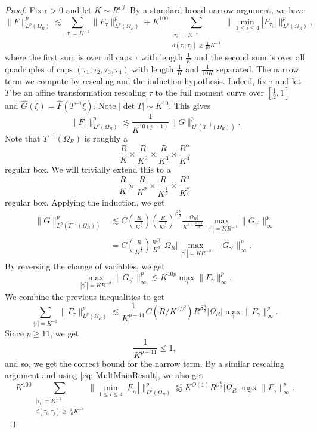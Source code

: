 \documentclass[12pt]{amsart}
\providecommand{\wh}{\widehat}
\begin{document}
\begin{proof}
    Fix $\epsilon>0$ and let $K\sim R^{\epsilon\beta}$. By a standard broad-narrow argument, we have $$\|F\|_{L^{p}(\Omega_R)}^{p}\lesssim \sum_{|\tau|=K^{-1}}\|F_\tau\|_{L^{p}(\Omega_R)}^{p}+K^{100}\sum_{\substack{|\tau_i|=K^{-1}\\ d(\tau_i, \tau_j)\ge \frac{1}{10}K^{-1}}}\|\min_{1\le i\le 4}|F_{\tau_i}|\|_{L^{p}(\Omega_R)}^{p},$$ where the first sum is over all caps $\tau$ with length $\frac{1}{K}$ and the second sum is over all quadruples of caps $(\tau_1, \tau_2, \tau_3, \tau_4)$ with length $\frac{1}{K}$ and $\frac{1}{10K}$ separated.  The narrow term we compute by rescaling and the induction hypothesis. Indeed, fix $\tau$ and let $T$ be an affine transformation rescaling $\tau$ to the full moment curve over $[\frac{1}{2}, 1]$ and $\wh{G}(\xi) = \wh{F}(T^{-1}\xi)$. Note $|\det T|\sim K^{10}$. This gives $$\|F_{\tau}\|_{L^{p}(\Omega_R)}^{p} \lesssim \frac{1}{K^{10(p-1)}} \|G\|_{L^{p}(T^{-1}(\Omega_R))}^{p}.$$ Note that $T^{-1}(\Omega_R)$ is roughly a $$\frac{R}{K}\times \frac{R}{K^2}\times \frac{R}{K^3}\times \frac{R^{\alpha}}{K^{4}}$$ regular box. We will trivially extend this to a $$\frac{R}{K}\times \frac{R}{K^2}\times \frac{R}{K^{\frac{1}{\beta}}}\times \frac{R^{\alpha}}{K^{\frac{\alpha}{\beta}}}$$ regular box. Applying the induction, we get \begin{align*}
        \|G\|_{L^{p}(T^{-1}(\Omega_R))}^{p}&\lesssim C(\frac{R}{K^{\frac{1}{\beta}}})\left(\frac{R}{K^{\frac{1}{\beta}}}\right)^{\beta \frac{p}{2}}\frac{|\Omega_R|}{K^{3+\frac{\alpha+1}{\beta}}}\max_{|\gamma^\prime|=KR^{-\beta}}\|G_{\gamma^\prime}\|_{\infty}^{p}\\
        &=  C(\frac{R}{K^{\frac{1}{\beta}}})\frac{R^{\beta\frac{p}{2}}}{K^p}|\Omega_R|\max_{|\gamma^\prime|=KR^{-\beta}}\|G_{\gamma^\prime}\|_{\infty}^{p}.
    \end{align*} By reversing the change of variables, we get $$\max_{|\gamma^\prime|=KR^{-\beta}}\|G_{\gamma^\prime}\|_{\infty}^{p}\lesssim K^{10p}\max_{\gamma}\|F_\gamma\|_{\infty}^{p}.$$
    We combine the previous inequalities to get $$\sum_{|\tau|=K^{-1}}\|F_{\tau}\|_{L^{p}(\Omega_R)}^{p}\lesssim 
    \frac{1}{K^{p-11}}C(R/K^{1/\beta})R^{\beta \frac{p}{2}}|\Omega_R|\max_{\gamma}\|F_\gamma\|_{\infty}^{p}.$$ Since $p\ge 11$, we get $$\frac{1}{K^{p-11}}\le 1,$$ and so, we get the correct bound for the narrow term. By a similar rescaling argument and using \eqref{eq: MultMainResult}, we also get $$K^{100}\sum_{\substack{|\tau_i|=K^{-1}\\ d(\tau_i, \tau_j)\ge \frac{1}{10}K^{-1}}}\|\min_{1\le i\le 4}|F_{\tau_i}|\|_{L^{p}(\Omega_R)}^{p}\lessapprox K^{O(1)}R^{\beta\frac{p}{2}}|\Omega_R|\max_{\gamma}\|F_{\gamma}\|_{\infty}^{p}.$$
\end{proof}
\end{document}
